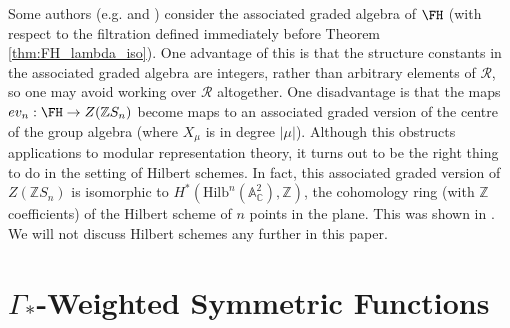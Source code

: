 \begin{remark}
Some authors (e.g. \cite{Wang1} and \cite[Example 25, Section 1.7]{Macdonald}) consider the associated graded algebra of $\FH$ (with respect to the filtration defined immediately before Theorem \ref{thm:FH_lambda_iso}). One advantage of this is that the structure constants in the associated graded algebra are integers, rather than arbitrary elements of $\mathcal{R}$, so one may avoid working over $\mathcal{R}$ altogether. One disadvantage is that the maps $ev_n: \FH \to Z(\mathbb{Z}S_n)$ become maps to an associated graded version of the centre of the group algebra (where $X_\mu$ is in degree $|\mu|$). Although this obstructs applications to modular representation theory, it turns out to be the right thing to do in the setting of Hilbert schemes. In fact, this associated graded version of $Z(\mathbb{Z}S_n)$ is isomorphic to $H^*(\mathrm{Hilb}^n(\mathbb{A}_{\mathbb{C}}^2), \mathbb{Z})$, the cohomology ring (with $\mathbb{Z}$ coefficients) of the Hilbert scheme of $n$ points in the plane. This was shown in \cite{LehnSorger}. We will not discuss Hilbert schemes any further in this paper.
\end{remark}




\section{\texorpdfstring{$\Gamma_*$}{Gamma}-Weighted Symmetric Functions} \label{LambdaG_section}

